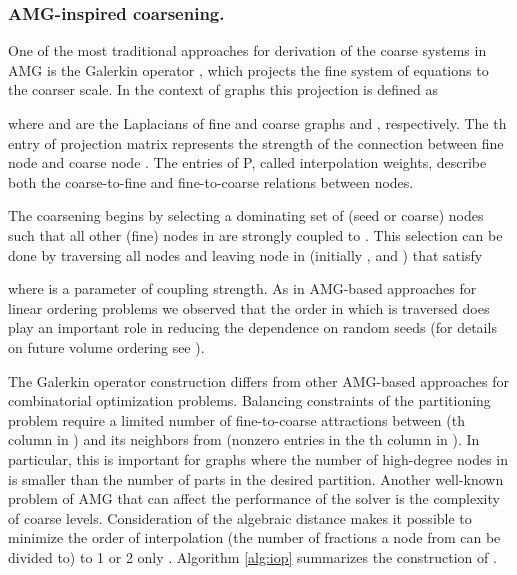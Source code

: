 \documentclass{llncs}
\begin{document}
\subsubsection{AMG-inspired coarsening.}
\par One of the most traditional approaches for derivation of the coarse systems in AMG is the Galerkin operator \cite{mgbooktrott}, which projects the fine system of equations to the coarser scale. In the context of graphs this projection is defined as

where  and  are the Laplacians of fine and coarse graphs  and , respectively. The th entry of projection matrix  represents the strength of the connection between fine node  and coarse node . The entries of P, called interpolation weights, describe both the coarse-to-fine and fine-to-coarse relations between nodes. 
\par The coarsening begins by selecting a dominating set of (seed or coarse) nodes  such that all other (fine) nodes in  are strongly coupled to . This selection can be done by traversing all nodes and leaving node  in  (initially , and ) that satisfy

where  is a parameter of coupling strength. As in AMG-based approaches for linear ordering problems \cite{safro2005} we observed that the order in which  is traversed does play an important role in reducing the dependence on random seeds (for details on future volume ordering see \cite{safro:relaxml}).
\par The Galerkin operator construction differs from other AMG-based approaches for combinatorial optimization problems. Balancing constraints of the partitioning problem require a limited number of fine-to-coarse attractions between  (th column in ) and its neighbors from  (nonzero entries in the th column in ). In particular, this is important for graphs where the number of high-degree nodes in  is smaller than the number of parts in the desired partition. Another well-known problem of AMG that can affect the performance of the solver is the complexity of coarse levels. Consideration of the algebraic distance makes it possible to minimize the order of interpolation (the number of fractions a node from  can be divided to) to 1 or 2 only \cite{safro:relaxml}. Algorithm \ref{alg:iop} summarizes the construction of .
\end{document}
